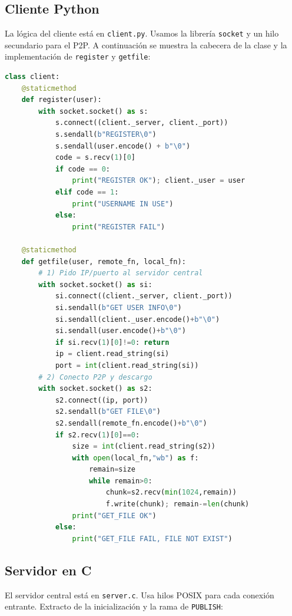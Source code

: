 \documentclass[12pt,a4paper]{article}
\begin{document}
\subsection{Cliente Python}

La lógica del cliente está en \texttt{client.py}. Usamos la librería \texttt{socket} y un hilo secundario para el P2P.  
A continuación se muestra la cabecera de la clase y la implementación de \texttt{register} y \texttt{getfile}:

\begin{lstlisting}[language=Python,caption={Fragmento de \texttt{client.py}: register y getfile},label=lst:client1]
class client:
    @staticmethod
    def register(user):
        with socket.socket() as s:
            s.connect((client._server, client._port))
            s.sendall(b"REGISTER\0")
            s.sendall(user.encode() + b"\0")
            code = s.recv(1)[0]
            if code == 0:
                print("REGISTER OK"); client._user = user
            elif code == 1:
                print("USERNAME IN USE")
            else:
                print("REGISTER FAIL")

    @staticmethod
    def getfile(user, remote_fn, local_fn):
        # 1) Pido IP/puerto al servidor central
        with socket.socket() as si:
            si.connect((client._server, client._port))
            si.sendall(b"GET USER INFO\0")
            si.sendall(client._user.encode()+b"\0")
            si.sendall(user.encode()+b"\0")
            if si.recv(1)[0]!=0: return
            ip = client.read_string(si)
            port = int(client.read_string(si))
        # 2) Conecto P2P y descargo
        with socket.socket() as s2:
            s2.connect((ip, port))
            s2.sendall(b"GET FILE\0")
            s2.sendall(remote_fn.encode()+b"\0")
            if s2.recv(1)[0]==0:
                size = int(client.read_string(s2))
                with open(local_fn,"wb") as f:
                    remain=size
                    while remain>0:
                        chunk=s2.recv(min(1024,remain))
                        f.write(chunk); remain-=len(chunk)
                print("GET_FILE OK")
            else:
                print("GET_FILE FAIL, FILE NOT EXIST")
\end{lstlisting}

\subsection{Servidor en C}

El servidor central está en \texttt{server.c}. Usa hilos POSIX para cada conexión entrante.  
Extracto de la inicialización y la rama de \texttt{PUBLISH}:
\end{document}
